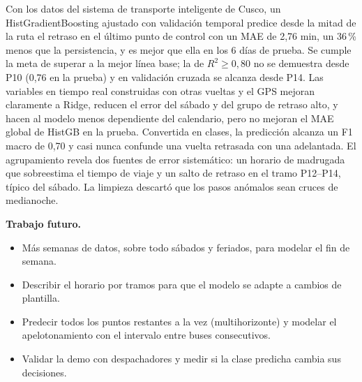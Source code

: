 \documentclass[conference,spanish]{IEEEtran}
\begin{document}
Con los datos del sistema de transporte inteligente de Cusco, un HistGradientBoosting ajustado con validación temporal predice desde la mitad de la ruta el retraso en el último punto de control con un MAE de 2,76 min, un 36\,\% menos que la persistencia, y es mejor que ella en los 6 días de prueba. Se cumple la meta de superar a la mejor línea base; la de $R^2\ge0{,}80$ no se demuestra desde P10 (0,76 en la prueba) y en validación cruzada se alcanza desde P14. Las variables en tiempo real construidas con otras vueltas y el GPS mejoran claramente a Ridge, reducen el error del sábado y del grupo de retraso alto, y hacen al modelo menos dependiente del calendario, pero no mejoran el MAE global de HistGB en la prueba. Convertida en clases, la predicción alcanza un F1 macro de 0,70 y casi nunca confunde una vuelta retrasada con una adelantada. El agrupamiento revela dos fuentes de error sistemático: un horario de madrugada que sobreestima el tiempo de viaje y un salto de retraso en el tramo P12--P14, típico del sábado. La limpieza descartó que los pasos anómalos sean cruces de medianoche.

\textbf{Trabajo futuro.}
\begin{itemize}
    \item Más semanas de datos, sobre todo sábados y feriados, para modelar el fin de semana.
    \item Describir el horario por tramos para que el modelo se adapte a cambios de plantilla.
    \item Predecir todos los puntos restantes a la vez (multihorizonte) y modelar el apelotonamiento con el intervalo entre buses consecutivos.
    \item Validar la demo con despachadores y medir si la clase predicha cambia sus decisiones.
\end{itemize}

\end{document}
